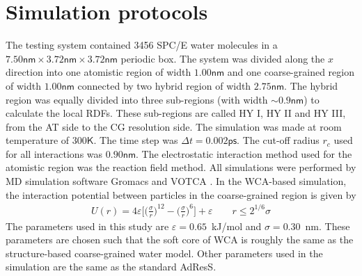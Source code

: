 \documentclass[aip,jcp,a4paper,reprint,onecolumn]{revtex4-1}
\begin{document}
\section{Simulation protocols}
\label{app:2}
The testing system contained 3456 SPC/E \cite{berendsen1987missing}
water molecules in a $7.50\textsf{nm}\times 3.72\textsf{nm}\times
3.72\textsf{nm}$ periodic box. The system was divided along the $x$ direction
into one atomistic region of width $1.00\textsf{nm}$ and one
coarse-grained region of width $1.00\textsf{nm}$ connected by two
hybrid region of width $2.75\textsf{nm}$.
The hybrid region was equally divided into three sub-regions (with width $\sim 0.9\textsf{nm}$)
to calculate the local RDFs.
These sub-regions are called HY I, HY II and HY III, from the AT side to the CG resolution side.
The simulation was made at
room temperature of $300\textsf{K}$. The time step was $\Delta t =
0.002\textsf{ps}$. The cut-off radius $r_{c}$ used for all interactions was
$0.90\textsf{nm}$. The electrostatic interaction method used for the
atomistic region was the reaction field method. All simulations were
performed by MD simulation software Gromacs \cite{gromacs}
and VOTCA \cite{ruehle2009versatile}.
In the WCA-based simulation, the interaction potential between particles in the coarse-grained region is given by
\begin{align}
  U(r) = 4\varepsilon
  \big[
  \big(\frac\sigma r\big)^{12}
  -
  \big(\frac\sigma r\big)^{6}
  \big]
  + \varepsilon
  \qquad  r\leq 2^{1/6}\sigma
\end{align}
The parameters used in this study are $\varepsilon = 0.65$~\textsf{kJ/mol}
and $\sigma = 0.30$~\textsf{nm}. These parameters are chosen such that
the soft core of WCA is roughly the same as the structure-based coarse-grained
water model.
Other parameters used in the simulation are the
same as the standard AdResS.
\end{document}
